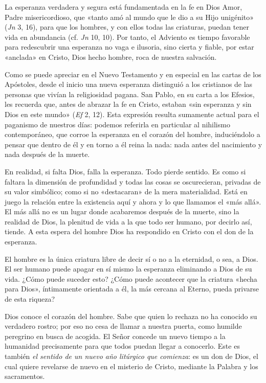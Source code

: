La esperanza verdadera y segura está fundamentada en la fe en Dios Amor,
Padre misericordioso, que «tanto amó al mundo que le dio a su Hijo
unigénito» (\emph{Jn} 3, 16), para que los hombres, y con ellos todas
las criaturas, puedan tener vida en abundancia (cf. \emph{Jn} 10, 10).
Por tanto, el Adviento es tiempo favorable para redescubrir una
esperanza no vaga e ilusoria, sino cierta y fiable, por estar «anclada»
en Cristo, Dios hecho hombre, roca de nuestra salvación.

Como se puede apreciar en el Nuevo Testamento y en especial en las
cartas de los Apóstoles, desde el inicio una nueva esperanza distinguió
a los cristianos de las personas que vivían la religiosidad pagana. San
Pablo, en su carta a los Efesios, les recuerda que, antes de abrazar la
fe en Cristo, estaban «sin esperanza y sin Dios en este mundo»
(\emph{Ef} 2, 12). Esta expresión resulta sumamente actual para el
paganismo de nuestros días: podemos referirla en particular al nihilismo
contemporáneo, que corroe la esperanza en el corazón del hombre,
induciéndolo a pensar que dentro de él y en torno a él reina la nada:
nada antes del nacimiento y nada después de la muerte.

En realidad, si falta Dios, falla la esperanza. Todo pierde sentido. Es
como si faltara la dimensión de profundidad y todas las cosas se
oscurecieran, privadas de su valor simbólico; como si no «destacaran» de
la mera materialidad. Está en juego la relación entre la existencia aquí
y ahora y lo que llamamos el «más allá». El más allá no es un lugar
donde acabaremos después de la muerte, sino la realidad de Dios, la
plenitud de vida a la que todo ser humano, por decirlo así, tiende. A
esta espera del hombre Dios ha respondido en Cristo con el don de la
esperanza.

El hombre es la única criatura libre de decir sí o no a la eternidad, o
sea, a Dios. El ser humano puede apagar en sí mismo la esperanza
eliminando a Dios de su vida. ¿Cómo puede suceder esto? ¿Cómo puede
acontecer que la criatura «hecha para Dios», íntimamente orientada a él,
la más cercana al Eterno, pueda privarse de esta riqueza?

Dios conoce el corazón del hombre. Sabe que quien lo rechaza no ha
conocido su verdadero rostro; por eso no cesa de llamar a nuestra
puerta, como humilde peregrino en busca de acogida. El Señor concede un
nuevo tiempo a la humanidad precisamente para que todos puedan llegar a
conocerlo. Este es también \emph{el sentido de un nuevo año litúrgico
	que comienza}: es un don de Dios, el cual quiere revelarse de nuevo en
el misterio de Cristo, mediante la Palabra y los sacramentos.

